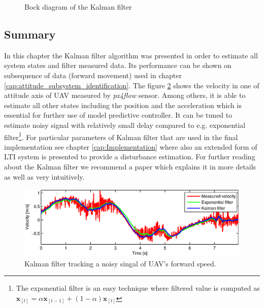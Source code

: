 \begin{figure}
\caption{Bock diagram of the Kalman filter}
\label{fig:kalman_diagram}
\end{figure}

\subsection{Summary}

In this chapter the Kalman filter algorithm was presented in order to estimate all system states and filter measured data. Its performance can be shown on subsequence of data (forward movement) used in chapter \ref{cap:attitude_subsystem_identification}. The figure \ref{fig:kalman1} shows the velocity in one of attitude axis of UAV measured by \emph{px4flow} sensor. Among others, it is able to estimate all other states including the position and the acceleration which is essential for further use of model predictive controller. It can be tuned to estimate noisy signal with relatively small delay compared to e.g. exponential filter\footnote{The exponential filter is an easy technique where filtered value is computed as $\textbf{\^x}_{[t]} = \alpha\textbf{\^x}_{[t-1]} + (1-\alpha)\textbf{x}_{[t]}$}. For particular parameters of Kalman filter that are used in the final implementation see chapter \ref{cap:Implementation} where also an extended form of LTI system is presented to provide a disturbance estimation. For further reading about the Kalman filter we recommend a paper \citep{faragher2012understandingKF} which explains it in more details as well as very intuitively.

\begin{figure}[h]
\includegraphics[width=1\textwidth]{fig/kalman1.eps} 
\caption{Kalman filter tracking a noisy singal of UAV's forward speed.}
\label{fig:kalman1}
\end{figure}
